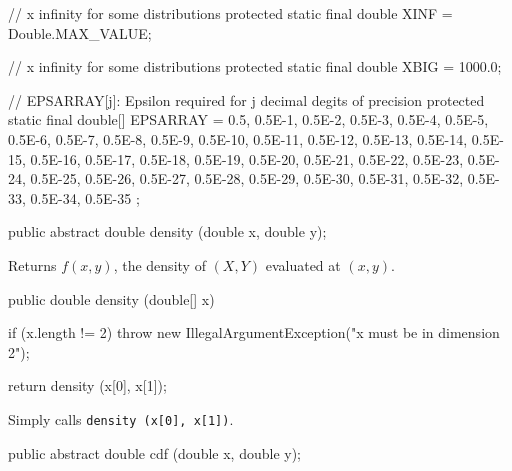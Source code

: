 \begin{code} \begin{hide}

    // x infinity for some distributions
     protected static final double XINF = Double.MAX_VALUE;  

    // x infinity for some distributions                                       
    protected static final double XBIG = 1000.0;  

    // EPSARRAY[j]: Epsilon required for j decimal degits of precision
    protected static final double[] EPSARRAY = {
    0.5, 0.5E-1, 0.5E-2, 0.5E-3, 0.5E-4, 0.5E-5, 0.5E-6, 0.5E-7, 0.5E-8,
    0.5E-9, 0.5E-10, 0.5E-11, 0.5E-12, 0.5E-13, 0.5E-14, 0.5E-15, 0.5E-16,
    0.5E-17, 0.5E-18, 0.5E-19, 0.5E-20, 0.5E-21, 0.5E-22, 0.5E-23, 0.5E-24,
    0.5E-25, 0.5E-26, 0.5E-27, 0.5E-28, 0.5E-29, 0.5E-30, 0.5E-31, 0.5E-32,
    0.5E-33, 0.5E-34, 0.5E-35
    };\end{hide}

   public abstract double density (double x, double y);
\end{code}
\begin{tabb} Returns $f(x, y)$, the density of $(X, Y)$ evaluated at $(x, y)$.
\end{tabb}
\begin{htmlonly}
   \return{density function evaluated at $(x, y)$
\end{htmlonly}
\begin{code}

   public double density (double[] x)\begin{hide} {
      if (x.length != 2)
         throw new IllegalArgumentException("x must be in dimension 2");

      return density (x[0], x[1]);
   }\end{hide}
\end{code}
\begin{tabb} Simply calls \texttt{density (x[0], x[1])}.
\end{tabb}
\begin{htmlonly}
   \return{density function evaluated at $(x[0], x[1])$
\end{htmlonly}
\begin{code}

   public abstract double cdf (double x, double y); \end{code}
